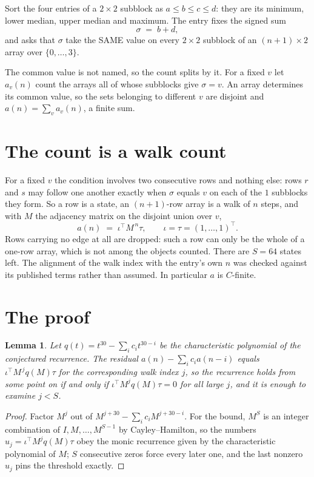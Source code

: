 \documentclass[11pt,a4paper]{article}
\theoremstyle{plain}
\newtheorem{lemma}[theorem]{Lemma}
\theoremstyle{definition}
\begin{document}
Sort the four entries of a $2\times2$ subblock as $a\le b\le c\le d$: they
are its minimum, lower median, upper median and maximum. The entry fixes the signed sum
\[
\sigma\;=\;b+d,
\]
and asks that $\sigma$ take the SAME value on every $2\times2$ subblock of an
$(n+1)\times2$ array over $\{0,\dots,3\}$.

The common value is not named, so the count splits by it. For a fixed $v$ let $a_v(n)$ count
the arrays all of whose subblocks give $\sigma=v$. An array determines its common value, so
the sets belonging to different $v$ are disjoint and $a(n)=\sum_v a_v(n)$, a finite sum.


\section{The count is a walk count}

For a fixed $v$ the condition involves two consecutive rows and nothing
else: rows $r$ and $s$ may follow one another exactly when $\sigma$ equals $v$ on each of the
$1$ subblocks they form. So a row is a state, an $(n+1)$-row array is a walk of $n$
steps, and with $M$ the adjacency matrix on the disjoint union over $v$,
\[
a(n)\;=\;\iota^{\!\top}M^{\,n}\tau,\qquad\iota=\tau=(1,\dots,1)^{\!\top} .
\]
Rows carrying no edge at all are dropped: such a row can only be the whole of a one-row
array, which is not among the objects counted. There are $S=64$ states left.
The alignment of the walk index with the entry's own $n$ was checked against its published
terms rather than assumed. In particular $a$ is $C$-finite.

\section{The proof}

\begin{lemma}\label{lem:crit}
Let $q(t)=t^{30}-\sum_i c_it^{30-i}$ be the characteristic polynomial of the
conjectured recurrence. The residual $a(n)-\sum_ic_ia(n-i)$ equals
$\iota^{\!\top}M^{\,j}q(M)\tau$ for the corresponding walk index $j$, so the recurrence
holds from some point on if and only if $\iota^{\!\top}M^{j}q(M)\tau=0$ for all large $j$,
and it is enough to examine $j<S$.
\end{lemma}

\begin{proof}
Factor $M^{j}$ out of $M^{j+30}-\sum_ic_iM^{j+30-i}$. For the bound, $M^{S}$
is an integer combination of $I,M,\dots,M^{S-1}$ by Cayley--Hamilton, so the numbers
$u_j=\iota^{\!\top}M^{j}q(M)\tau$ obey the monic recurrence given by the characteristic
polynomial of $M$; $S$ consecutive zeros force every later one, and the last nonzero $u_j$
pins the threshold exactly.
\end{proof}
\end{document}
